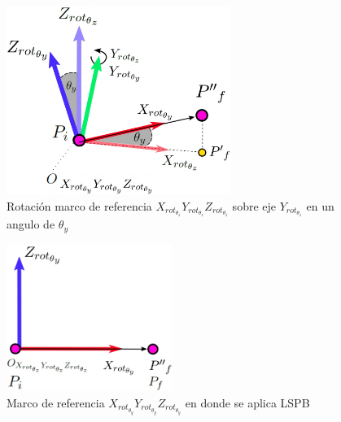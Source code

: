                  \begin{figure}[htb]
                \centering
                \includegraphics[width=0.65\textwidth]{Main/Chapter6/Images6/DIBUJO533.jpg}
                \caption{Rotación marco de referencia $X_{rot_{\theta_z}}Y_{rot_{\theta_z}}Z_{rot_{\theta_z}}$ sobre eje $Y_{rot_{\theta_z}}$ en un angulo de $\theta_y$}
        \end{figure}
        
                \begin{figure}[htb]
                \centering
                \includegraphics[width=0.48\textwidth]{Main/Chapter6/Images6/DIBUJO534.jpg}
                \caption{Marco de referencia $X_{rot_{\theta_y}}Y_{rot_{\theta_y}}Z_{rot_{\theta_y}}$ en donde se aplica LSPB}
        \end{figure}


    \newpage

